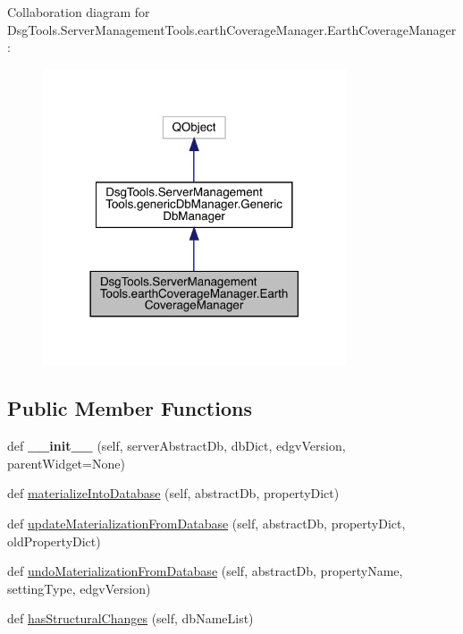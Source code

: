 Collaboration diagram for Dsg\+Tools.\+Server\+Management\+Tools.\+earth\+Coverage\+Manager.\+Earth\+Coverage\+Manager\+:
\nopagebreak
\begin{figure}[H]
\begin{center}
\leavevmode
\includegraphics[width=254pt]{class_dsg_tools_1_1_server_management_tools_1_1earth_coverage_manager_1_1_earth_coverage_manager__coll__graph}
\end{center}
\end{figure}
\subsection*{Public Member Functions}
\begin{DoxyCompactItemize}
\item 
\mbox{\label{class_dsg_tools_1_1_server_management_tools_1_1earth_coverage_manager_1_1_earth_coverage_manager_aa4b588467b4d5ee8624849536226e692}} 
def {\bfseries \+\_\+\+\_\+init\+\_\+\+\_\+} (self, server\+Abstract\+Db, db\+Dict, edgv\+Version, parent\+Widget=None)
\item 
def \mbox{\hyperlink{class_dsg_tools_1_1_server_management_tools_1_1earth_coverage_manager_1_1_earth_coverage_manager_ad06d5264ccd27c99fe7b995d6d6fa2d3}{materialize\+Into\+Database}} (self, abstract\+Db, property\+Dict)
\item 
def \mbox{\hyperlink{class_dsg_tools_1_1_server_management_tools_1_1earth_coverage_manager_1_1_earth_coverage_manager_a50e332bb5bd3aae306177fc65db5e910}{update\+Materialization\+From\+Database}} (self, abstract\+Db, property\+Dict, old\+Property\+Dict)
\item 
def \mbox{\hyperlink{class_dsg_tools_1_1_server_management_tools_1_1earth_coverage_manager_1_1_earth_coverage_manager_a57d96153e643d66180678145e086b07a}{undo\+Materialization\+From\+Database}} (self, abstract\+Db, property\+Name, setting\+Type, edgv\+Version)
\item 
def \mbox{\hyperlink{class_dsg_tools_1_1_server_management_tools_1_1earth_coverage_manager_1_1_earth_coverage_manager_adecdddf9813576c871f87ab5cee417b2}{has\+Structural\+Changes}} (self, db\+Name\+List)
\end{DoxyCompactItemize}
